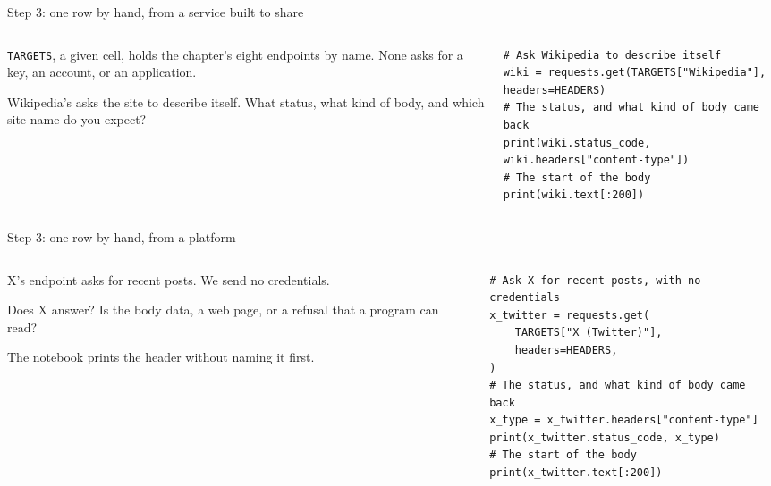 \documentclass[9pt,aspectratio=169]{beamer}
\begin{document}
\begin{frame}[fragile]{Step 3: one row by hand, from a service built to share}
    \begin{columns}[T]
        \begin{column}{0.37\textwidth}
            \texttt{TARGETS}, a given cell, holds the chapter's eight endpoints by name. None asks for a key, an account, or an application.

            \medskip
            Wikipedia's asks the site to describe itself. What status, what kind of body, and which site name do you expect?
        \end{column}
        \begin{column}{0.6\textwidth}
\begin{lstlisting}[basicstyle=\ttfamily\footnotesize]
# Ask Wikipedia to describe itself
wiki = requests.get(TARGETS["Wikipedia"], headers=HEADERS)
# The status, and what kind of body came back
print(wiki.status_code, wiki.headers["content-type"])
# The start of the body
print(wiki.text[:200])
\end{lstlisting}
        \end{column}
    \end{columns}
\end{frame}

\begin{frame}[fragile]{Step 3: one row by hand, from a platform}
    \begin{columns}[T]
        \begin{column}{0.37\textwidth}
            X's endpoint asks for recent posts. We send no credentials.

            \medskip
            Does X answer? Is the body data, a web page, or a refusal that a program can read?

            \medskip
            The notebook prints the header without naming it first.
        \end{column}
        \begin{column}{0.6\textwidth}
\begin{lstlisting}[basicstyle=\ttfamily\footnotesize]
# Ask X for recent posts, with no credentials
x_twitter = requests.get(
    TARGETS["X (Twitter)"],
    headers=HEADERS,
)
# The status, and what kind of body came back
x_type = x_twitter.headers["content-type"]
print(x_twitter.status_code, x_type)
# The start of the body
print(x_twitter.text[:200])
\end{lstlisting}
        \end{column}
    \end{columns}
\end{frame}
\end{document}
